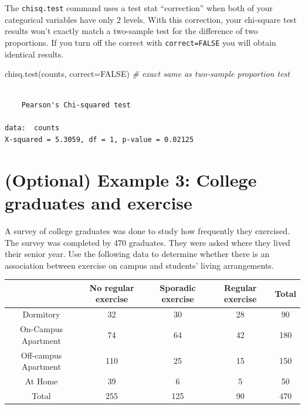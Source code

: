 \documentclass[
]{book}
\newenvironment{Shaded}{\begin{snugshade}}{\end{snugshade}}
\newcommand{\AttributeTok}[1]{\textcolor[rgb]{0.77,0.63,0.00}{#1}}
\newcommand{\CommentTok}[1]{\textcolor[rgb]{0.56,0.35,0.01}{\textit{#1}}}
\newcommand{\ConstantTok}[1]{\textcolor[rgb]{0.00,0.00,0.00}{#1}}
\newcommand{\FunctionTok}[1]{\textcolor[rgb]{0.00,0.00,0.00}{#1}}
\newcommand{\NormalTok}[1]{#1}
\begin{document}
The \texttt{chisq.test} command uses a test stat ``correction'' when both of your categorical variables have only 2 levels. With this correction, your chi-square test results won't exactly match a two-sample test for the difference of two proportions. If you turn off the correct with \texttt{correct=FALSE} you will obtain identical results.

\begin{Shaded}
\begin{Highlighting}[]
\FunctionTok{chisq.test}\NormalTok{(counts, }\AttributeTok{correct=}\ConstantTok{FALSE}\NormalTok{) }\CommentTok{\# exact same as two{-}sample proportion test}
\end{Highlighting}
\end{Shaded}

\begin{verbatim}

    Pearson's Chi-squared test

data:  counts
X-squared = 5.3059, df = 1, p-value = 0.02125
\end{verbatim}

\hypertarget{optional-example-3-college-graduates-and-exercise}{%
\section{(Optional) Example 3: College graduates and exercise}\label{optional-example-3-college-graduates-and-exercise}}

A survey of college graduates was done to study how frequently they exercised. The survey was completed by 470 graduates. They were asked where they lived their senior year. Use the following data to determine whether there is an association between exercise on campus and students' living arrangements.

\begin{tabular}{|c|c|c|c|c|} \hline
 & No regular exercise & Sporadic exercise & Regular exercise & Total \\  \hline
Dormitory & 32 & 30 & 28 & 90  \\ \hline 
On-Campus Apartment & 74 & 64 & 42 & 180  \\ \hline 
Off-campus Apartment & 110 & 25 & 15 & 150 \\ \hline 
At Home & 39 & 6 & 5 &  50 \\ \hline 
Total & 255 & 125 & 90 & 470 \\ \hline 
\end{tabular}
\end{document}
